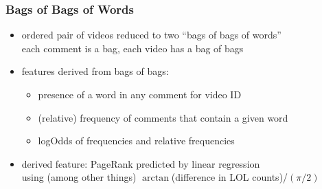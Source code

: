\documentclass[fleqn]{beamer}
\begin{document}
\begin{frame}
\frametitle{Bags of Bags of Words}
      \begin{itemize}
         \item ordered pair of videos reduced to two ``bags of bags of words''  \\
                  each comment is a bag, each video has a bag of bags

         \item features derived from bags of bags:
             \begin{itemize}
                 \item presence of a word in any comment for video ID
                 \item (relative) frequency of comments that contain a given word
                 \item  logOdds of frequencies and relative frequencies
              \end{itemize}
         
         \item derived feature: PageRank predicted by linear regression\\ 
                  using (among other things) $\arctan$(difference in LOL counts)/$({\pi}/2)$
     
     \end{itemize}
\end{frame}



%
%
%
%     
%
\end{document}
